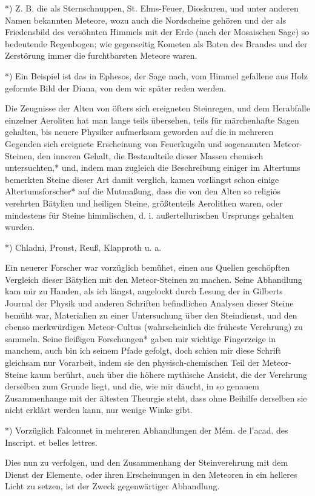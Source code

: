 \documentclass[a4paper, 11pt, oneside, polutonikogreek, german]{article}
\begin{document}
*) Z. B. die als Sternschnuppen, St. Elms-Feuer, Dioskuren, und unter anderen Namen bekannten Meteore, wozu auch die Nordscheine gehören und der als Friedensbild des versöhnten Himmels mit der Erde (nach der Mosaischen Sage) so bedeutende Regenbogen; wie gegenseitig Kometen als Boten des Brandes und der Zerstörung immer die furchtbarsten Meteore waren.

*) Ein Beispiel ist das in Ephesos, der Sage nach, vom Himmel gefallene aus Holz geformte Bild der Diana, von dem wir später reden werden.

Die Zeugnisse der Alten von öfters sich ereigneten Steinregen, und dem Herabfalle einzelner Aeroliten hat man lange teils übersehen, teils für märchenhafte Sagen gehalten, bis neuere Physiker aufmerksam geworden auf die in mehreren Gegenden sich ereignete Erscheinung von Feuerkugeln und sogenannten Meteor-Steinen, den inneren Gehalt, die Bestandteile dieser Massen chemisch untersuchten,* und, indem man zugleich die Beschreibung einiger im Altertums bemerkten Steine dieser Art damit verglich, kamen vorlängst schon einige Altertumsforscher* auf die Mutmaßung, dass die von den Alten so religiös verehrten Bätylien und heiligen Steine, größtenteils Aerolithen waren, oder mindestens für Steine himmlischen, d. i. außertellurischen Ursprungs gehalten wurden.

*) Chladni, Proust, Reuß, Klapproth u. a.

Ein neuerer Forscher war vorzüglich bemühet, einen aus Quellen geschöpften Vergleich dieser Bätylien mit den Meteor-Steinen zu machen. Seine Abhandlung kam mir zu Handen, als ich längst, angelockt durch Lesung der in Gilberts Journal der Physik und anderen Schriften befindlichen Analysen dieser Steine bemüht war, Materialien zu einer Untersuchung über den Steindienst, und den ebenso merkwürdigen Meteor-Cultus (wahrscheinlich die früheste Verehrung) zu sammeln. Seine fleißigen Forschungen* gaben mir wichtige Fingerzeige in manchem, auch bin ich seinem Pfade gefolgt, doch schien mir diese Schrift gleichsam nur Vorarbeit, indem sie den physisch-chemischen Teil der Meteor-Steine kaum berührt, auch über die höhere mythische Ansicht, die der Verehrung derselben zum Grunde liegt, und die, wie mir däucht, in so genauem Zusammenhange mit der ältesten Theurgie steht, dass ohne Beihilfe derselben sie nicht erklärt werden kann, nur wenige Winke gibt.

*) Vorzüglich Falconnet in mehreren Abhandlungen der Mém. de l'acad. des Inscript. et belles lettres.

Dies nun zu verfolgen, und den Zusammenhang der Steinverehrung mit dem Dienst der Elemente, oder ihren Erscheinungen in den Meteoren in ein helleres Licht zu setzen, ist der Zweck gegenwärtiger Abhandlung.
\end{document}
